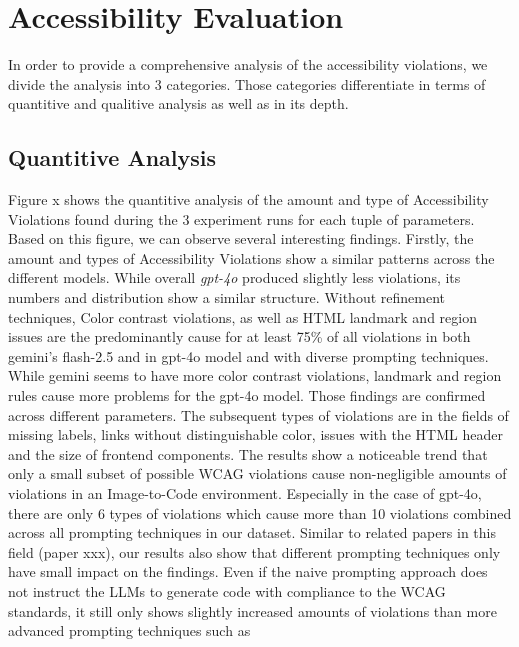 \section{Accessibility Evaluation}
In order to provide a comprehensive analysis of the accessibility violations, 
we divide the analysis into 3 categories. Those categories differentiate in 
terms of quantitive and qualitive analysis as well as in its depth.

\subsection{Quantitive Analysis}
Figure x shows the quantitive analysis of the amount and type of Accessibility 
Violations found during the 3 experiment runs for each tuple of parameters.
Based on this figure, we can observe several interesting findings.\newline
Firstly, the amount and types of Accessibility Violations show a similar 
patterns across the different models. While overall \textit{gpt-4o} produced
slightly less violations, its numbers and distribution show a similar 
structure. Without refinement techniques, Color contrast violations, 
as well as HTML landmark and region 
issues are the predominantly cause for at least 75\% of all violations in both
gemini's flash-2.5 and in gpt-4o model and with diverse prompting techniques.\newline
While gemini seems to have more color contrast violations, 
landmark and region rules cause more problems for the gpt-4o model. Those 
findings are confirmed across different parameters.\newline
The subsequent types of violations are in the fields of missing labels,
links without distinguishable color, issues with the HTML header and 
the size of frontend components. The results show a noticeable trend that 
only a small subset of possible WCAG violations cause non-negligible amounts 
of violations in an Image-to-Code environment. Especially in the case of 
gpt-4o, there are only 6 types of violations which cause more than 10
violations combined across all prompting techniques in our dataset.\newline
Similar to related papers in this field (paper xxx), our results also show 
that different prompting techniques only have small impact on the findings.
Even if the naive prompting approach does not instruct the LLMs to generate
code with compliance to the WCAG standards, it still only shows slightly 
increased amounts of violations than more advanced prompting techniques such as 

